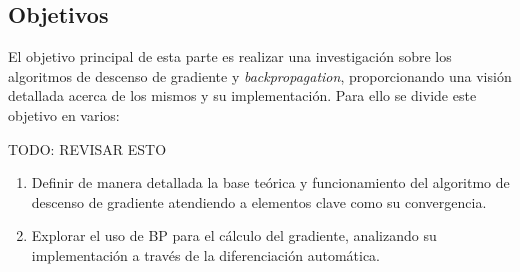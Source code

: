 \subsection{Objetivos}

El objetivo principal de esta parte es realizar una investigación sobre los algoritmos de descenso de gradiente y \textit{backpropagation}, proporcionando una visión detallada acerca de los mismos y su implementación. Para ello se divide este objetivo en varios:

TODO: REVISAR ESTO
\begin{enumerate}

    
    \item Definir de manera detallada la base teórica y funcionamiento del algoritmo de descenso de gradiente atendiendo a elementos clave como su convergencia.

    \item Explorar el uso de BP para el cálculo del gradiente, analizando su implementación a través de la diferenciación automática.


\end{enumerate}



